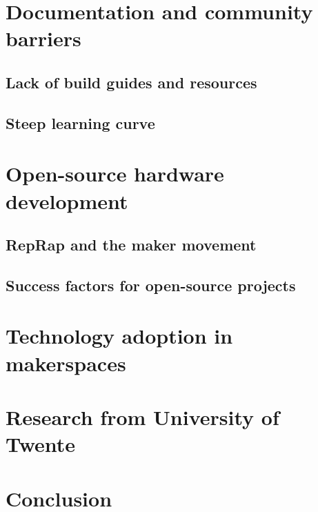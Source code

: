 \section{Documentation and community barriers}
\label{sec:lit-documentation}

\subsection{Lack of build guides and resources}
\subsection{Steep learning curve}

\section{Open-source hardware development}
\label{sec:lit-oshw}

\subsection{RepRap and the maker movement}
\subsection{Success factors for open-source projects}

\section{Technology adoption in makerspaces}
\label{sec:lit-adoption}

\section{Research from University of Twente}
\label{sec:lit-ut}

\section{Conclusion}
\label{sec:lit-conclusion}
